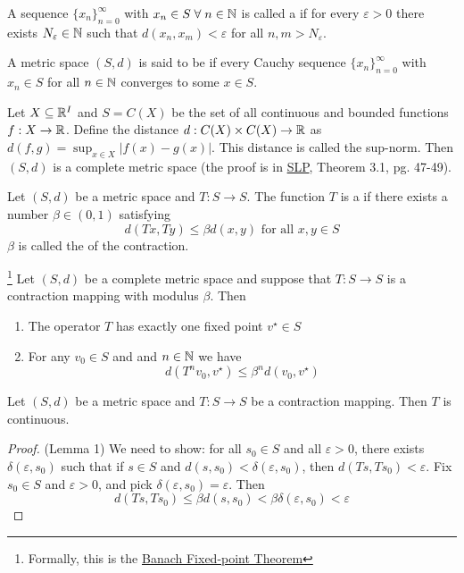 \documentclass[10pt]{article}
\begin{document}
\begin{definition}
	A sequence $\{x_n\}_{n=0}^\infty$ with $x_n \in S \forall n \in \naturals$ is called a  if for every $\varepsilon > 0$ there exists $N_\varepsilon \in \mathbb{N} $ such that $d(x_n,x_m) < \varepsilon$ for all $n,m > N_\varepsilon$.
\end{definition}

\begin{definition}
	A metric space $(S,d)$ is said to be  if every Cauchy sequence $\{x_n\}_{n=0}^\infty$ with $x_n \in S$ for all $n \in \mathbb{N}$ converges to some $x \in S$.
\end{definition}

\begin{example}
	Let $X \subseteq \mathbb{R}^I$ and $S = C(X)$ be the set of all continuous and bounded functions $f : X \to \mathbb{R}$. Define the distance $d : C(X) \times C(X) \to \mathbb{R}$ as $d(f,g) = \sup_{x \in X} |f(x) - g(x)|$. This distance is called the sup-norm. Then $(S,d)$ is a complete metric space (the proof is in \href{https://www.hup.harvard.edu/books/9780674750968}{SLP}, Theorem 3.1, pg. 47-49).
\end{example}

\begin{definition}
	Let $(S,d)$ be a metric space and $T: S \to S$. The function $T$ is a  if there exists a number $\beta \in (0,1)$ satisfying
	\[
	d(Tx,Ty) \le \beta d(x,y) \text{ for all } x,y \in S
	\]
	$\beta$ is called the  of the contraction.
\end{definition}

\begin{theorem}\label{thm:contraction_mapping}
	\footnote{Formally, this is the \href{https://en.wikipedia.org/wiki/Banach_fixed-point_theorem}{Banach Fixed-point Theorem}} Let $(S,d)$ be a complete metric space and suppose that $T: S \to S$ is a contraction mapping with modulus $\beta$. Then
	\begin{enumerate}
		\item The operator $T$ has exactly one fixed point $v^\star \in S$
		\item For any $v_0 \in S$ and and $n \in \mathbb{N}$ we have
		\[
		d(T^n v_0,v^\star) \le \beta^n d(v_0,v^\star)
		\]
	\end{enumerate}
\end{theorem}

\begin{lemma}
	Let $(S,d)$ be a metric space and $T: S \to S$ be a contraction mapping. Then $T$ is continuous.
\end{lemma}
\begin{proof} (Lemma 1)
	We need to show: for all $s_0 \in S$ and all $\varepsilon > 0$, there exists $\delta(\varepsilon, s_0)$ such that if $s \in S$ and $d(s,s_0) < \delta(\varepsilon, s_0)$, then $d(Ts,Ts_0) < \varepsilon$. Fix $s_0 \in S$ and $\varepsilon > 0$, and pick $\delta(\varepsilon, s_0) = \varepsilon$. Then
	\[
	d(Ts,Ts_0) \le \beta d(s,s_0) < \beta \delta(\varepsilon, s_0) < \varepsilon
	\]
\end{proof}
\end{document}
